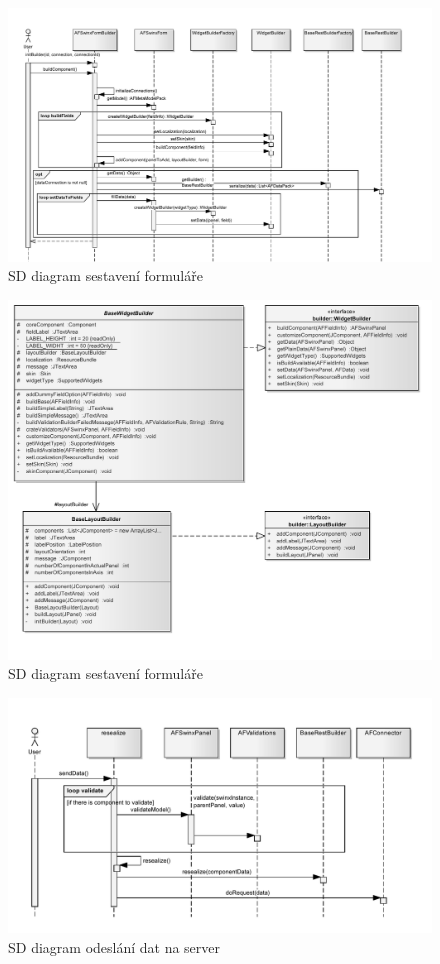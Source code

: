 \documentclass[11pt,twoside,a4paper]{book}
\begin{document}
\begin{figure}
\includegraphics[angle=270]{images/sdDiagram}
\caption{SD diagram sestavení formuláře}
\label{img:sdDiagram}
\end{figure}	

\begin{figure}
\includegraphics[angle=270]{images/abstractBuilder}
\caption{SD diagram sestavení formuláře}
\label{img:abstractBuilder}
\end{figure}	

\begin{figure}
\includegraphics[angle=270]{images/sdResealization}
\caption{SD diagram odeslání dat na server}
\label{img:sdResealization}
\end{figure}	
\end{document}
